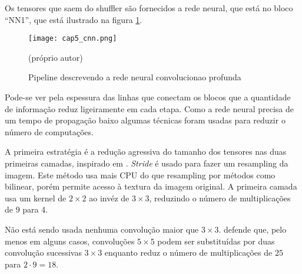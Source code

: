 Os tensores que saem do shuffler são fornecidos a rede neural, que está no
bloco “NN1”, que está ilustrado na figura \ref{fig:cap5_cnn}.

\begin{figure}[!htb]
	\centering
	\texttt{[image: cap5\_cnn.png]}
	\caption{Pipeline descrevendo a rede neural convolucionao profunda}
	\label{fig:cap5_cnn}
	(próprio autor)
\end{figure}

Pode-se ver pela espessura das linhas que conectam os blocos que a quantidade
de informação reduz ligeiramente em cada etapa. Como a rede neural precisa
de um tempo de propagação baixo algumas técnicas foram usadas para
reduzir o número de computações.

A primeira estratégia é a redução agressiva do tamanho dos tensores nas duas
primeiras camadas, inspirado em \cite{szegedy2015going}. \emph{Stride} é usado
para fazer um resampling da imagem. Este método usa mais CPU do que resampling
por métodos como bilinear, porém permite acesso à textura da imagem original. A
primeira camada usa um kernel de $2 \times 2$ ao invéz de $3 \times 3$,
reduzindo o número de multiplicações de 9 para 4.

Não está sendo usada nenhuma convolução maior que $3 \times 3$.
\cite{szegedy2015going} defende que, pelo menos em alguns casos,
convoluções $5 \times 5$ podem ser substituídas por duas convolução
sucessivas $3 \times 3$ enquanto reduz o número de
multiplicações de $25$ para $2 \cdot 9=18$.

